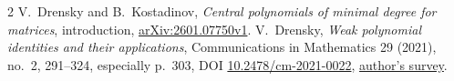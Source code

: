 \documentclass[11pt,a4paper]{article}
\begin{document}
\begin{thebibliography}{2}
V.~Drensky and B.~Kostadinov, \emph{Central polynomials of minimal degree
for matrices}, introduction,
\href{https://arxiv.org/abs/2601.07750v1}{arXiv:2601.07750v1}.
V.~Drensky, \emph{Weak polynomial identities and their applications},
Communications in Mathematics 29 (2021), no.~2, 291--324,
especially p.~303, DOI \href{https://doi.org/10.2478/cm-2021-0022}{10.2478/cm-2021-0022},
\href{https://dml.cz/bitstream/handle/10338.dmlcz/149196/ActaOstrav_29-2021-2_11.pdf}{author's survey}.
\end{thebibliography}
\end{document}
